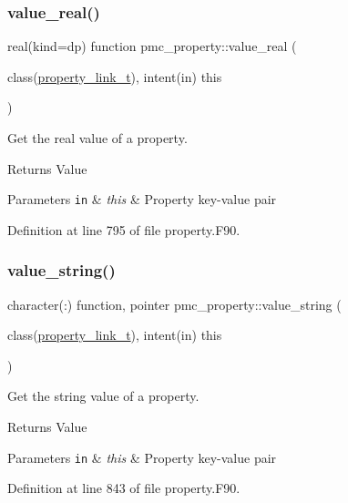 \subsubsection{\texorpdfstring{value\+\_\+real()}{value\_real()}}
{\footnotesize\ttfamily real(kind=dp) function pmc\+\_\+property\+::value\+\_\+real (\begin{DoxyParamCaption}\item[{class(\mbox{\hyperlink{structpmc__property_1_1property__link__t}{property\+\_\+link\+\_\+t}}), intent(in)}]{this }\end{DoxyParamCaption})\hspace{0.3cm}{\ttfamily [private]}}



Get the real value of a property. 

\begin{DoxyReturn}{Returns}
Value
\end{DoxyReturn}

\begin{DoxyParams}[1]{Parameters}
\mbox{\tt in}  & {\em this} & Property key-\/value pair \\
\hline
\end{DoxyParams}


Definition at line 795 of file property.\+F90.

\mbox{\label{namespacepmc__property_ad5dcdbd8450ec28999baff573c4edada}} 
\subsubsection{\texorpdfstring{value\+\_\+string()}{value\_string()}}
{\footnotesize\ttfamily character(\+:) function, pointer pmc\+\_\+property\+::value\+\_\+string (\begin{DoxyParamCaption}\item[{class(\mbox{\hyperlink{structpmc__property_1_1property__link__t}{property\+\_\+link\+\_\+t}}), intent(in)}]{this }\end{DoxyParamCaption})\hspace{0.3cm}{\ttfamily [private]}}



Get the string value of a property. 

\begin{DoxyReturn}{Returns}
Value
\end{DoxyReturn}

\begin{DoxyParams}[1]{Parameters}
\mbox{\tt in}  & {\em this} & Property key-\/value pair \\
\hline
\end{DoxyParams}


Definition at line 843 of file property.\+F90.

